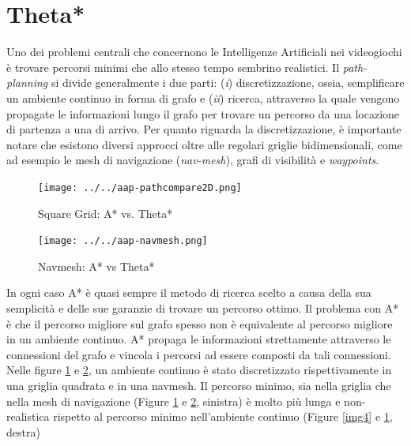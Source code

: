 \documentclass[12pt]{book}
\begin{document}
\section{Theta*}

\label{sec:theta}

\par{Uno dei problemi centrali che concernono le Intelligenze Artificiali nei videogiochi \`e trovare percorsi minimi che allo stesso tempo sembrino realistici. Il \emph{path-planning} si divide generalmente i due parti: (\emph{i}) discretizzazione, ossia, semplificare un ambiente continuo in forma di grafo e (\emph{ii}) ricerca, attraverso la quale vengono propagate le informazioni lungo il grafo per trovare un percorso da una locazione di partenza a una di arrivo. Per quanto riguarda la discretizzazione, \`e importante notare che esistono diversi approcci oltre alle regolari griglie bidimensionali, come ad esempio le mesh di navigazione (\emph{nav-mesh}), grafi di visibilit\`a e  \emph{waypoints}.}

\begin{figure}[htp]
\centering
\texttt{[image: ../../aap-pathcompare2D.png]}
\caption{Square Grid: A* vs. Theta* }
\label{img5}
\end{figure}

\begin{figure}[htp]
\centering
\texttt{[image: ../../aap-navmesh.png]}
\caption{Navmesh: A* vs Theta*}
\label{img6}
\end{figure}

\par{In ogni caso A* \`e quasi sempre il metodo di ricerca scelto a causa della sua semplicit\`a e delle sue garanzie di trovare un percorso ottimo. Il problema con A* \`e che il percorso migliore sul grafo spesso non \`e equivalente al percorso migliore in un ambiente continuo. A* propaga le informazioni strettamente attraverso le connessioni del grafo e vincola i percorsi ad essere composti da tali connessioni. Nelle figure \ref{img5} e \ref{img6}, un ambiente continuo \`e stato discretizzato rispettivamente in una griglia quadrata e in una navmesh. Il percorso minimo, sia nella griglia che nella mesh di navigazione (Figure \ref{img5} e \ref{img6}, sinistra) \`e molto pi\`u lunga e non-realistica rispetto al percorso minimo nell'ambiente continuo (Figure \ref{img4} e \ref{img5}, destra)}
\end{document}
